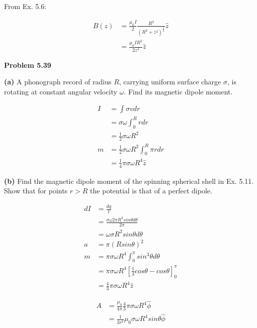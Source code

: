 \documentclass{article}
\begin{document}
From Ex. 5.6:

\begin{equation*}
\begin{split}
	B(z) & = \frac{\mu_0 I}{2} \frac{R^2}{(R^2 + z^2)^{\frac{3}{2}}} \hat{z} \\
	& = \frac{\mu_0 I R^2}{2 z^3} \hat{z}
\end{split}
\end{equation*}

\textbf{Problem 5.39}

\textbf{(a)}
A phonograph record of radius $R$, carrying uniform surface charge $\sigma$, is rotating at constant angular velocity $\omega$.
Find its magnetic dipole moment.

\begin{equation*}
\begin{split}
	I & = \int \sigma v dr \\
	& = \sigma \omega \int_0^R r dr \\
	& = \frac{1}{2} \sigma \omega R^2 \\
	m & = \frac{1}{2} \sigma \omega R^2 \int_0^R \pi r dr \\
	& = \boxed{\frac{1}{4} \pi \sigma \omega R^4 \hat{z}}
\end{split}
\end{equation*}

\textbf{(b)}
Find the magnetic dipole moment of the spinning spherical shell in Ex. 5.11.
Show that for points $r > R$ the potential is that of a perfect dipole.

\begin{equation*}
\begin{split}
	dI & = \frac{dq}{t} \\
	& = \frac{\sigma \omega 2 \pi R^2 sin\theta d\theta}{2 \pi} \\
	& = \omega \sigma R^2 sin\theta d\theta \\
	a & = \pi (R sin\theta)^2 \\
	m & = \pi \sigma \omega R^4 \int_0^\pi sin^3\theta d\theta \\
	& = \pi \sigma \omega R^4 [\frac{1}{3} cos\theta - cos\theta]_0^\pi \\
	& = \boxed{\frac{4}{3} \pi \sigma \omega R^4 \hat{z}}
\end{split}
\end{equation*}

\begin{equation*}
\begin{split}
	A & = \frac{\mu_0}{4 \pi} \frac{4}{3} \pi \sigma \omega R^4 \hat{\phi} \\
	& = \frac{1}{3 r^2} \mu_0 \sigma \omega R^4 sin\theta \hat{\phi}
\end{split}
\end{equation*}
\end{document}

